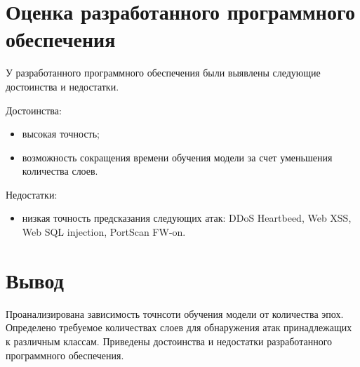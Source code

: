 \section{Оценка разработанного программного обеспечения}
У разработанного программного обеспечения были выявлены следующие
достоинства и недостатки.

Достоинства:
\begin{itemize}
    \item высокая точность;
    \item возможность сокращения времени обучения модели за счет уменьшения количества слоев.
\end{itemize}

Недостатки:
\begin{itemize}
    \item низкая точность предсказания следующих атак: DDoS Heartbeed, Web XSS, Web SQL injection, PortScan FW-on.
\end{itemize}

\section*{Вывод}
Проанализирована зависимость точнсоти обучения модели от количества эпох. Определено требуемое количествах слоев для обнаружения атак принадлежащих к различным классам.  Приведены достоинства и недостатки разработанного программного обеспечения.


